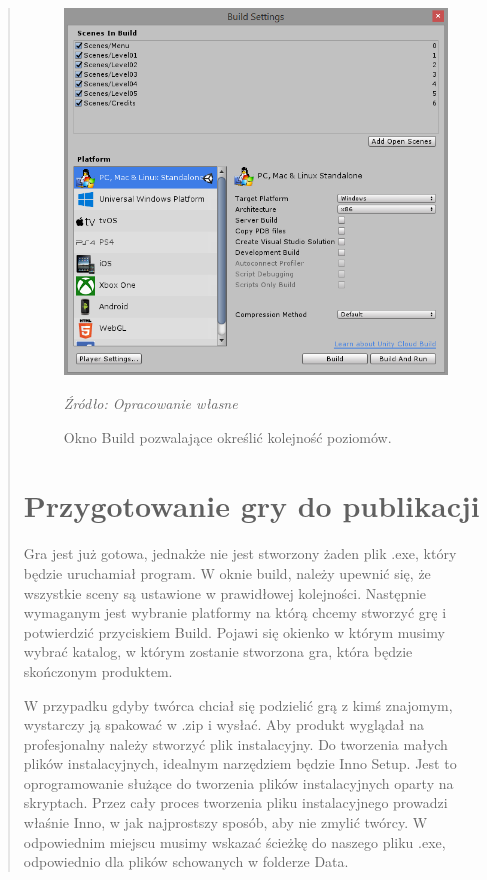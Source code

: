 \begin{quotation}
\begin{figure}[!h]
\centering
  \includegraphics[width=0.9\linewidth]{build.png}
  \caption{Okno Build pozwalające określić kolejność poziomów.}\label{rys_29}
  \begin{minipage}[t]{0.75\linewidth}
    \emph{Źródło: Opracowanie własne}
  \end{minipage}
\end{figure}


\newpage
\section{Przygotowanie gry do publikacji}
\indent Gra jest już gotowa, jednakże nie jest stworzony żaden plik .exe, który będzie uruchamiał program. W oknie build, należy upewnić się, że wszystkie sceny są ustawione w prawidłowej kolejności. Następnie wymaganym jest wybranie platformy na którą chcemy stworzyć grę i potwierdzić przyciskiem Build. Pojawi się okienko w którym musimy wybrać katalog, w którym zostanie stworzona gra, która będzie skończonym produktem.

\indent W przypadku gdyby twórca chciał się podzielić grą z kimś znajomym, wystarczy ją spakować w .zip i wysłać. Aby produkt wyglądał na profesjonalny należy stworzyć plik instalacyjny. Do tworzenia małych plików instalacyjnych, idealnym narzędziem będzie Inno Setup. Jest to oprogramowanie służące do tworzenia plików instalacyjnych oparty na skryptach. Przez cały proces tworzenia pliku instalacyjnego prowadzi właśnie Inno, w jak najprostszy sposób, aby nie zmylić twórcy. W odpowiednim miejscu musimy wskazać ścieżkę do naszego pliku .exe, odpowiednio dla plików schowanych w folderze Data. 


\end{quotation}
